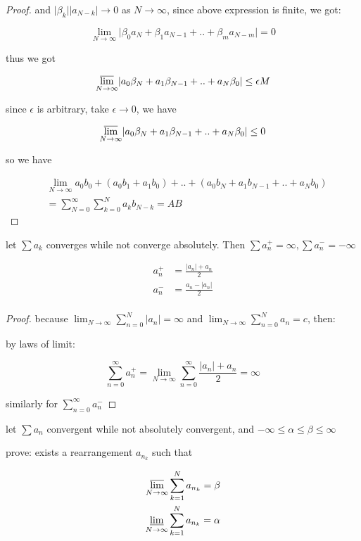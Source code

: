 \begin{proof}
    and $\lvert \beta_k \rvert \lvert a_{N-k} \rvert \to 0$ as $N \to \infty$, since above expression is finite, we got:

    \[
        \lim_{N \to \infty}\lvert \beta_0a_N + \beta_1 a_{N-1} + .. + \beta_ma_{N-m} \rvert = 0
    \]

    thus we got

    \[
        \varlimsup_{N \to \infty}\lvert a_0\beta_N + a_1 \beta_{N-1} + .. + a_N\beta_{0} \rvert \le \epsilon M
    \]

    since $\epsilon$ is arbitrary, take $\epsilon \to 0$, we have

    \[
        \varlimsup_{N \to \infty}\lvert a_0\beta_N + a_1 \beta_{N-1} + .. + a_N\beta_{0} \rvert \le 0
    \]

    so we have

    \begin{align*}
        &\lim_{N \to \infty}a_0b_0 + (a_0b_1 + a_1b_0) + .. + (a_0b_N + a_1b_{N-1} + .. + a_Nb_0) \\
        &= \sum_{N=0}^{\infty}\sum_{k=0}^{N}a_kb_{N-k} = AB
    \end{align*}
\end{proof}

\begin{thm}
    \label{thm:3-6-9}
    let $\sum a_k$ converges while not converge absolutely. Then $\sum a_n^+ = \infty, \sum a_n^- = -\infty$


    \begin{align*}
        a_n^+ &= \frac{\lvert a_n \rvert + a_n}{2} \\
        a_n^- &= \frac{a_n - \lvert a_n \rvert}{2} \\
    \end{align*}
\end{thm}

\begin{proof}
    because $\lim_{N \to \infty}\sum_{n=0}^{N}\lvert a_n \rvert = \infty$ and $\lim_{N \to \infty}\sum_{n=0}^{N}a_n = c$, then:

    by laws of limit:

    \[
        \sum_{n=0}^{\infty}a_n^+ = \lim_{N \to \infty}\sum_{n=0}^{\infty}\frac{\lvert a_n \rvert + a_n}{2} = \infty
    \]

    similarly for  $\sum_{n=0}^{\infty}a_n^-$
\end{proof}

\begin{thm}
    \label{thm:3-6-10}
    let $\sum a_n$ convergent while not absolutely convergent, and $-\infty \le \alpha \le \beta \le \infty$ 
    
    prove: exists a rearrangement $a_{n_k}$ such that

    \begin{align*}
        \varlimsup_{N \to \infty}\sum_{k=1}^{N}a_{n_k} = \beta \\
        \varliminf_{N \to \infty}\sum_{k=1}^{N}a_{n_k} = \alpha \\
    \end{align*}

\end{thm}

